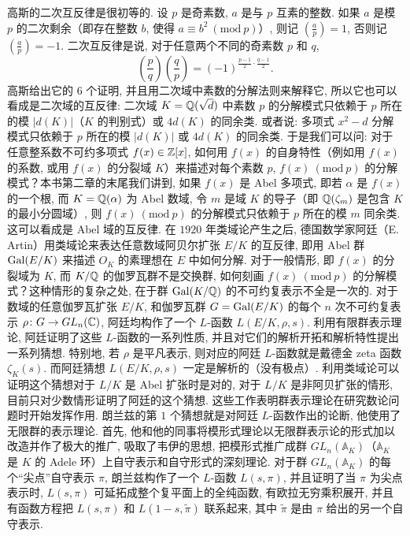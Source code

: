 高斯的二次互反律是很初等的. 设 $p$ 是奇素数, $a$ 是与 $p$ 互素的整数. 如果 $a$ 是模 $p$ 的二次剩余（即存在整数 $b$, 使得 $a\equiv b^2\ (\mathrm{mod}\ p)$）, 则记 $\left(\frac{a}{p}\right)=1$, 否则记 $\left(\frac{a}{p}\right)=-1$. 二次互反律是说, 对于任意两个不同的奇素数 $p$ 和 $q$,
\[
  \left(\frac{p}{q}\right)\left(\frac{q}{p}\right)
  =(-1)^{\frac{p-1}{2}\cdot\frac{q-1}{2}}.
\]
高斯给出它的 $6$ 个证明, 并且用二次域中素数的分解法则来解释它, 所以它也可以看成是二次域的互反律: 二次域 $K=\mathbb{Q}(\sqrt{d})$ 中素数 $p$ 的分解模式只依赖于 $p$ 所在的模 $|d(K)|$（$K$ 的判别式）或 $4d(K)$ 的同余类. 或者说: 多项式 $x^2-d$ 分解模式只依赖于 $p$ 所在的模 $|d(K)|$ 或 $4d(K)$ 的同余类. 于是我们可以问: 对于任意整系数不可约多项式 $f(x)\in\mathbb{Z}[x]$, 如何用 $f(x)$ 的自身特性（例如用 $f(x)$ 的系数, 或用 $f(x)$ 的分裂域 $K$）来描述对每个素数 $p$, $f(x)\ (\mathrm{mod}\ p)$ 的分解模式？本书第二章的末尾我们讲到, 如果 $f(x)$ 是 Abel 多项式, 即若 $\alpha$ 是 $f(x)$ 的一个根, 而 $K=\mathbb{Q}(\alpha)$ 为 Abel 数域, 令 $m$ 是域 $K$ 的导子（即 $\mathbb{Q}(\zeta_m)$ 是包含 $K$ 的最小分圆域）, 则 $f(x)\ (\mathrm{mod}\ p)$ 的分解模式只依赖于 $p$ 所在的模 $m$ 同余类. 这可以看成是 Abel 域的互反律. 在 $1920$ 年类域论产生之后, 德国数学家阿廷（E. Artin）用类域论来表达任意数域阿贝尔扩张 $E/K$ 的互反律, 即用 Abel 群 $\operatorname{Gal}(E/K)$ 来描述 $O_K$ 的素理想在 $E$ 中如何分解. 对于一般情形, 即 $f(x)$ 的分裂域为 $K$, 而 $K/\mathbb{Q}$ 的伽罗瓦群不是交换群, 如何刻画 $f(x)\ (\mathrm{mod}\ p)$ 的分解模式？这种情形的复杂之处, 在于群 $\operatorname{Gal}(K/\mathbb{Q})$ 的不可约复表示不全是一次的. 对于数域的任意伽罗瓦扩张 $E/K$, 和伽罗瓦群 $G=\operatorname{Gal}(E/K)$ 的每个 $n$ 次不可约复表示 $\rho\colon G\to GL_n(\mathbb{C})$, 阿廷均构作了一个 $L$-函数 $L(E/K,\rho,s)$. 利用有限群表示理论, 阿廷证明了这些 $L$-函数的一系列性质, 并且对它们的解析开拓和解析特性提出一系列猜想. 特别地, 若 $\rho$ 是平凡表示, 则对应的阿廷 $L$-函数就是戴德金 zeta 函数 $\zeta_K(s)$. 而阿廷猜想 $L(E/K,\rho,s)$ 一定是解析的（没有极点）. 利用类域论可以证明这个猜想对于 $L/K$ 是 Abel 扩张时是对的, 对于 $L/K$ 是非阿贝扩张的情形, 目前只对少数情形证明了阿廷的这个猜想. 这些工作表明群表示理论在研究数论问题时开始发挥作用. 朗兰兹的第 $1$ 个猜想就是对阿廷 $L$-函数作出的论断, 他使用了无限群的表示理论. 首先, 他和他的同事将模形式理论以无限群表示论的形式加以改造并作了极大的推广, 吸取了韦伊的思想, 把模形式推广成群 $GL_n(\mathbb{A}_K)$（$\mathbb{A}_K$ 是 $K$ 的 Adele 环）上自守表示和自守形式的深刻理论. 对于群 $GL_n(\mathbb{A}_K)$ 的每个``尖点''自守表示 $\pi$, 朗兰兹构作了一个 $L$-函数 $L(s,\pi)$, 并且证明了当 $\pi$ 为尖点表示时, $L(s,\pi)$ 可延拓成整个复平面上的全纯函数, 有欧拉无穷乘积展开, 并且有函数方程把 $L(s,\pi)$ 和 $L(1-s,\tilde{\pi})$ 联系起来, 其中 $\tilde{\pi}$ 是由 $\pi$ 给出的另一个自守表示.

